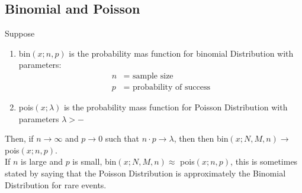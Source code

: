 \subsection[Binomial and Poisson]{Binomial and Poisson}
Suppose \begin{enumerate}[itemsep=0pt, topsep=1pt, partopsep=0pt,label=(\alph*)]
\item bin$(x;n,p)$ is the probability mas function for binomial Distribution with parameters: \begin{align*}
n&=\text{ sample size}\\
p&=\text{ probability of success}
\end{align*}
\item pois$(x;\lambda)$ is the probability mass function for Poisson Distribution with parameters $\lambda>-$
\end{enumerate}
Then, if $n\to \infty$ and $p\to 0$ such that $n\cdot p\to \lambda$, then then bin$(x;N,M,n)\to$ pois$(x;n,p)$. 
\\

If $n$ is large and $p$ is small, bin$(x;N,M,n)\approx$ pois$(x;n,p)$, this is sometimes stated by saying that the Poisson Distribution is approximately the Binomial Distribution for rare events.